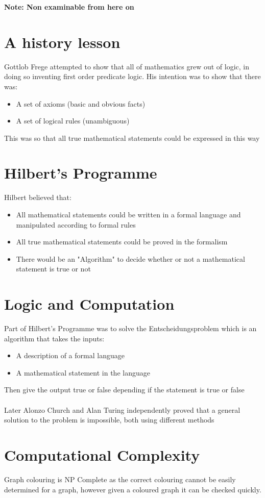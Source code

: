 \documentclass{article}[18pt]
\begin{document}
\begin{center}
{\huge \textbf{Note: Non examinable from here on}}
\end{center}
\section{A history lesson}
Gottlob Frege attempted to show that all of mathematics grew out of logic, in doing so inventing first order predicate logic. His intention was to show that there was:
\begin{itemize}
\item A set of axioms (basic and obvious facts)
\item A set of logical rules (unambiguous)
\end{itemize}
This was so that all true mathematical statements could be expressed in this way
\section{Hilbert's Programme}
Hilbert believed that:
\begin{itemize}
\item All mathematical statements could be written in a formal language and manipulated according to formal rules
\item All true mathematical statements could be proved in the formalism
\item There would be an "Algorithm" to decide whether or not a mathematical statement is true or not
\end{itemize}
\section{Logic and Computation}
Part of Hilbert's Programme was to solve the Entscheidungsproblem which is an algorithm that takes the inputs:
\begin{itemize}
 \item A description of a formal language 
 \item A mathematical statement in the language
 \end{itemize} 
Then give the output true or false depending if the statement is true or false\\
\\
Later Alonzo Church and Alan Turing independently proved that a general solution to the problem is impossible, both using different methods
\section{Computational Complexity}
Graph colouring is NP Complete as the correct colouring cannot be easily determined for a graph, however given a coloured graph it can be checked quickly.
\end{document}
